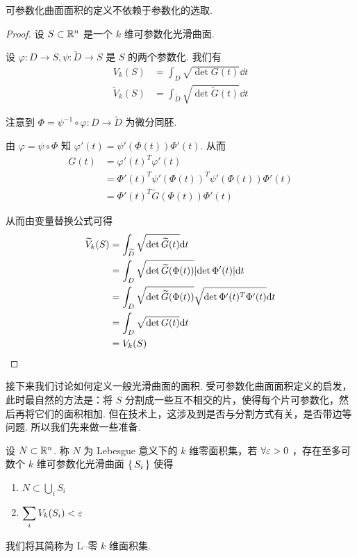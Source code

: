 \begin{property}
    可参数化曲面面积的定义不依赖于参数化的选取.
\end{property}
\begin{proof}
    设 $S\subset\mathbb{R}^n$ 是一个 $k$ 维可参数化光滑曲面.

    设 $\varphi:D\to S,\psi:\widetilde{D}\to S$ 是 $S$ 的两个参数化. 我们有
$$
\begin{aligned}
    V_k(S)&=\int_D\sqrt{\det{G(t)}}\dd t\\
    \widetilde{V}_k(S)&=\int_{\widetilde{D}}\sqrt{\det{\widetilde{G}(t)}}\dd t
\end{aligned}
$$

    注意到 $\Phi=\psi^{-1}\circ\varphi:D\to\widetilde{D}$ 为微分同胚.


    由 $\varphi=\psi\circ\Phi$ 知 $\varphi'(t)=\psi'(\Phi(t))\Phi'(t)$. 从而
$$
\begin{aligned}
    G(t)&=\varphi'(t)^T\varphi'(t)\\
    &=\Phi'(t)^T\psi'(\Phi(t))^T\psi'(\Phi(t))\Phi'(t)\\
    &=\Phi'(t)^T\widetilde{G}(\Phi(t))\Phi'(t)
\end{aligned}
$$

从而由变量替换公式可得
$$
\begin{aligned}
\widetilde{V}_k(S)&=\int_{\widetilde{D}}\sqrt{\det\widetilde{G}(t)}\mathrm{d} t\\
&=\int_D\sqrt{\det\widetilde{G}(\Phi(t))}\lvert{\det\Phi'(t)}\rvert\mathrm{d} t\\
&=\int_D\sqrt{\det\widetilde{G}(\Phi(t))}\sqrt{\det\Phi'(t)^T\Phi'(t)}\mathrm{d} t\\
&=\int_D\sqrt{\det G(t)}\mathrm{d} t\\
&=V_k(S)
\end{aligned}
$$
\end{proof}


接下来我们讨论如何定义一般光滑曲面的面积.
受可参数化曲面面积定义的启发，此时最自然的方法是：将 $S$ 分割成一些互不相交的片，使得每个片可参数化，然后再将它们的面积相加.
但在技术上，这涉及到是否与分割方式有关，是否带边等问题. 所以我们先来做一些准备.


\begin{definition}
    设 $N\subset\mathbb{R}^n$. 称 $N$ 为 Lebesgue 意义下的 $k$ 维零面积集，若 $\forall\varepsilon>0$ ，存在至多可数个 $k$ 维可参数化光滑曲面 $\set{S_i}$ 使得
    \begin{enumerate}
        \item $\displaystyle N\subset\bigcup_i S_i$
        \item $\displaystyle \sum_{i}V_k(S_i)<\varepsilon$
    \end{enumerate}

    我们将其简称为 L--零 $k$ 维面积集.
\end{definition}

